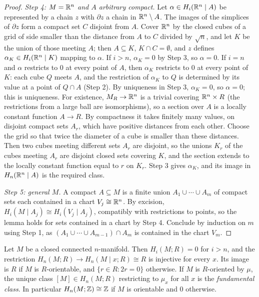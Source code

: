 \begin{proof}
\emph{Step 4: $M = \mathbb{R}^n$ and $A$ arbitrary compact.} Let $\alpha \in H_i(\mathbb{R}^n \mid A)$ be represented by a chain $z$ with $\partial z$ a chain in $\mathbb{R}^n \setminus A$. The images
of the simplices of $\partial z$ form a compact set $C$ disjoint from $A$. Cover $\mathbb{R}^n$ by the closed cubes of a grid of side smaller than the distance from $A$ to $C$
divided by $\sqrt{n}$, and let $K$ be the union of those meeting $A$; then $A \subseteq K$, $K \cap C = \emptyset$, and $z$ defines $\alpha_K \in H_i(\mathbb{R}^n \mid K)$ mapping to
$\alpha$. If $i > n$, $\alpha_K = 0$ by Step 3, so $\alpha = 0$. If $i = n$ and $\alpha$ restricts to $0$ at every point of $A$, then $\alpha_K$ restricts to $0$ at every point
of $K$: each cube $Q$ meets $A$, and the restriction of $\alpha_K$ to $Q$ is determined by its value at a point of $Q \cap A$ (Step 2). By uniqueness in Step 3,
$\alpha_K = 0$, so $\alpha = 0$; this is uniqueness. For existence, $M_R \to \mathbb{R}^n$ is a trivial covering $\mathbb{R}^n \times R$ (the restrictions from a large ball are
isomorphisms), so a section over $A$ is a locally constant function $A \to R$. By compactness it takes finitely many values, on disjoint compact sets $A_r$, which have
positive distances from each other. Choose the grid so that twice the diameter of a cube is smaller than these distances. Then two cubes meeting different sets $A_r$ are
disjoint, so the unions $K_r$ of the cubes meeting $A_r$ are disjoint closed sets covering $K$, and the section extends to the locally constant function equal to $r$ on
$K_r$. Step 3 gives $\alpha_K$, and its image in $H_n(\mathbb{R}^n \mid A)$ is the required class.

\emph{Step 5: general $M$.} A compact $A \subseteq M$ is a finite union $A_1 \cup \cdots \cup A_m$ of compact sets each contained in a chart $V_j \cong \mathbb{R}^n$. By excision,
$H_i(M \mid A_j) \cong H_i(V_j \mid A_j)$, compatibly with restrictions to points, so the lemma holds for sets contained in a chart by Step 4. Conclude by induction on
$m$ using Step 1, as $(A_1 \cup \cdots \cup A_{m-1}) \cap A_m$ is contained in the chart $V_m$.
\end{proof}

\begin{theorem}\label{poincare-duality:theorem-fundamental-class}
Let $M$ be a closed connected $n$-manifold. Then $H_i(M; R) = 0$ for $i > n$, and the restriction $H_n(M; R) \to H_n(M \mid x; R) \cong R$ is injective for every $x$. Its
image is $R$ if $M$ is $R$-orientable, and $\{r \in R : 2r = 0\}$ otherwise. If $M$ is $R$-oriented by $\mu$, the unique class $[M] \in H_n(M; R)$ restricting to $\mu_x$
for all $x$ is the \emph{fundamental class}. In particular $H_n(M; \mathbb{Z}) \cong \mathbb{Z}$ if $M$ is orientable and $0$ otherwise.
\end{theorem}

